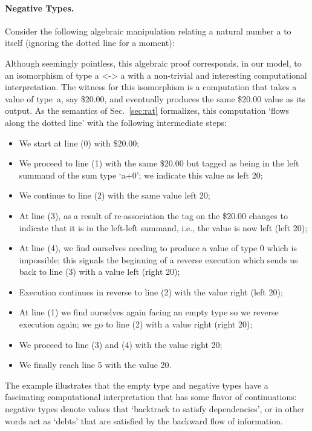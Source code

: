 \documentclass[preprint]{sigplanconf}
\begin{document}
\paragraph*{Negative Types.} 
Consider the following algebraic manipulation relating a natural number {{a}}
to itself (ignoring the dotted line for a moment):
\begin{center}
\end{center}
Although seemingly pointless, this algebraic proof corresponds, in our model,
to an isomorphism of type {{a <-> a}} with a non-trivial and interesting
computational interpretation. The witness for this isomorphism is a
computation that takes a value of type~{{a}}, say \$20.00, and eventually
produces the same \$20.00 value as its output. As the semantics of
Sec.~\ref{sec:rat} formalizes, this computation `flows along the dotted
line' with the following intermediate steps:
\begin{itemize}
\item We start at line (0) with \$20.00; 
\item We proceed to line (1) with the same \$20.00 but tagged as being
  in the left summand of the sum type `{{a+0}}'; we indicate this value
  as {{left 20}};
\item We continue to line (2) with the same value {{left 20}};
\item At line (3), as a result of re-association the tag on the \$20.00
  changes to indicate that it is in the left-left summand, i.e., the value is
  now {{left (left 20)}};
\item At line (4), we find ourselves needing to produce a value of type 0
  which is impossible; this signals the beginning of a reverse execution
  which sends us back to line (3) with a value {{left (right 20)}};
\item Execution continues in reverse to line (2) with the value 
  {{right (left 20)}};
\item At line (1) we find ourselves again facing an empty type so we reverse
  execution again; we go to line (2) with a value {{right (right 20)}};
\item We proceed to line (3) and (4) with the value {{right 20}};
\item We finally reach line 5 with the value {{20}}.
\end{itemize}
The example illustrates that the empty type and negative types have a
fascinating computational interpretation that has some flavor of
continuations: negative types denote values that `backtrack to satisfy
dependencies', or in other words act as `debts' that are satisfied by
the backward flow of information.
\end{document}
